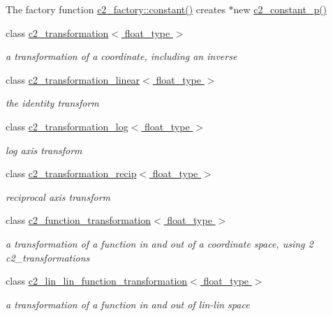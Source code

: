 \begin{DoxyCompactItemize}
\begin{DoxyCompactList}
The factory function \hyperlink{classc2__factory_a98e385b2b927d15d4376821302061d4d}{c2\+\_\+factory\+::constant()} creates $\ast$new \hyperlink{classc2__constant__p_ae62311ccce870ca4fb79b7c9d525a3d2}{c2\+\_\+constant\+\_\+p()} \end{DoxyCompactList}\item 
class \hyperlink{classc2__transformation}{c2\+\_\+transformation$<$ float\+\_\+type $>$}
\begin{DoxyCompactList}\small\item\em a transformation of a coordinate, including an inverse \end{DoxyCompactList}\item 
class \hyperlink{classc2__transformation__linear}{c2\+\_\+transformation\+\_\+linear$<$ float\+\_\+type $>$}
\begin{DoxyCompactList}\small\item\em the identity transform \end{DoxyCompactList}\item 
class \hyperlink{classc2__transformation__log}{c2\+\_\+transformation\+\_\+log$<$ float\+\_\+type $>$}
\begin{DoxyCompactList}\small\item\em log axis transform \end{DoxyCompactList}\item 
class \hyperlink{classc2__transformation__recip}{c2\+\_\+transformation\+\_\+recip$<$ float\+\_\+type $>$}
\begin{DoxyCompactList}\small\item\em reciprocal axis transform \end{DoxyCompactList}\item 
class \hyperlink{classc2__function__transformation}{c2\+\_\+function\+\_\+transformation$<$ float\+\_\+type $>$}
\begin{DoxyCompactList}\small\item\em a transformation of a function in and out of a coordinate space, using 2 c2\+\_\+transformations \end{DoxyCompactList}\item 
class \hyperlink{classc2__lin__lin__function__transformation}{c2\+\_\+lin\+\_\+lin\+\_\+function\+\_\+transformation$<$ float\+\_\+type $>$}
\begin{DoxyCompactList}\small\item\em a transformation of a function in and out of lin-\/lin space \end{DoxyCompactList}\item 

\end{DoxyCompactItemize}
